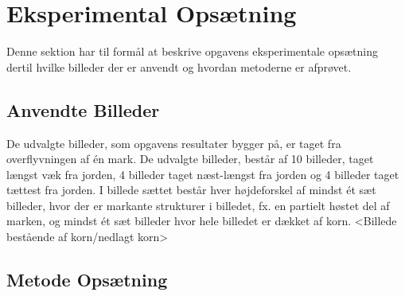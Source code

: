\chapter{Eksperimental Opsætning}
Denne sektion har til formål at beskrive opgavens eksperimentale opsætning dertil hvilke billeder der er anvendt og hvordan metoderne er afprøvet.
\section{Anvendte Billeder}
De udvalgte billeder, som opgavens resultater bygger på, er taget fra overflyvningen af én mark. De udvalgte billeder, består af 10 billeder, taget længst væk fra jorden, 4 billeder taget næst-længst fra jorden og 4 billeder taget tættest fra jorden. I billede sættet består hver højdeforskel af mindst ét sæt billeder, hvor der er markante strukturer i billedet, fx. en partielt høstet del af marken, og mindst ét sæt billeder hvor hele billedet er dækket af korn.
<Billede bestående af korn/nedlagt korn>
\section{Metode Opsætning}
